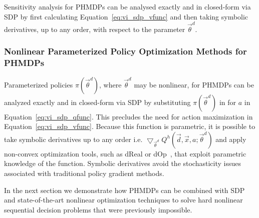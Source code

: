 
Sensitivity analysis for PHMDPs can be analysed exactly and in closed-form via SDP by first calculating Equation~\eqref{eq:vi_sdp_vfunc} and then taking symbolic derivatives, up to any order, with respect to the parameter {\footnotesize $\vec{\theta}^{d}$}.


\subsubsection{Nonlinear Parameterized Policy Optimization Methods for PHMDPs}

Parameterized policies {\footnotesize $ \pi(\vec{\theta}^{d}) $}, where {\footnotesize $\vec{\theta}^{d}$} may be nonlinear, for PHMDPs can be analyzed exactly and in closed-form via SDP by substituting {\footnotesize $ \pi(\vec{\theta}^{d}) $} in for {\footnotesize  $ a $} in Equation~\eqref{eq:vi_sdp_qfunc}. This precludes the need for action maximization in Equation~\eqref{eq:vi_sdp_vfunc}. Because this function is parametric, it is possible to take symbolic derivatives up to any order i.e. {\footnotesize $\bigtriangledown_{\vec{\theta}^{d}} Q^{h}(\vec{d}, \vec{x}, a; \vec{\theta}^{d})$ } and apply non-convex optimization tools, such as dReal or dOp~\parencite{Gao2013}, that exploit parametric knowledge of the function. Symbolic derivatives avoid the stochasticity issues associated with traditional policy gradient methods.

In the next section we demonstrate how PHMDPs can be combined with SDP and state-of-the-art nonlinear optimization techniques to solve hard nonlinear sequential decision problems that were previously impossible.